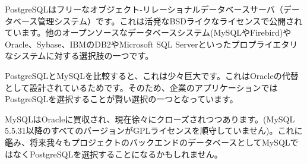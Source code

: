 PostgreSQLはフリーなオブジェクト-リレーショナルデータベースサーバ（データベース管理システム）です。これは活発なBSDライクなライセンスで公開されています。他のオープンソースなデータベースシステム(MySQLやFirebird)やOracle、Sybase、IBMのDB2やMicrosoft SQL Serverといったプロプライエタリなシステムに対する選択肢の一つです。

PostgreSQLとMySQLを比較すると、これは少々巨大です。これはOracleの代替として設計されているためです。そのため、企業のアプリケーションではPostgreSQLを選択することが賢い選択の一つとなっています。

MySQLはOracleに買収され、現在徐々にクローズされつつあります。(MySQL 5.5.31以降のすべてのバージョンがGPLライセンスを順守していません)。これに鑑み、将来我々もプロジェクトのバックエンドのデータベースとしてMySQLではなくPostgreSQLを選択することになるかもしれません。

